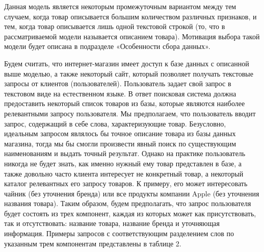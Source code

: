 \documentclass[12pt,a4paper]{article}
\begin{document}
\begin{table}[H]
\begin{center}
    \caption{Пример данных в базе интернет-магазина}
\end{center}
\end{table}

\noindent 
Данная модель является некоторым промежуточным вариантом между тем случаем, когда товар описывается большим количеством различных признаков, и тем, когда товар описывается лишь одной текстовой строкой (то, что в рассматриваемой модели называется описанием товара). Мотивация выбора такой модели будет описана в подразделе «Особенности сбора данных».\textbf{}

Будем считать, что интернет-магазин имеет доступ к базе данных с описанной выше моделью, а также некоторый сайт, который позволяет получать текстовые запросы от клиентов (пользователей). Пользователь задает свой запрос в текстовом виде на естественном языке. В ответ поисковая система должна предоставить некоторый список товаров из базы, которые являются наиболее релевантными запросу пользователя. Мы предполагаем, что пользователь вводит запрос, содержащий в себе слова, характеризующие товар. Безусловно, идеальным запросом являлось бы точное описание товара из базы данных магазина, тогда мы бы смогли произвести явный поиск по существующим наименованиям и выдать точный результат. Однако на практике пользователь никогда не будет знать, как именно нужный ему товар представлен в базе, а также довольно часто клиента интересует не конкретный товар, а некоторый каталог релевантных его запросу товаров. К примеру, его может интересовать чайник (без уточнения бренда) или все продукты компании Apple (без уточнения названия товара). Таким образом, будем предполагать, что запрос пользователя будет состоять из трех компонент, каждая из которых может как присутствовать, так и отсутствовать: название товара, название бренда и уточняющая информация. Примеры запросов с соответствующим разделением слов по указанным трем компонентам представлены в таблице 2.
\end{document}
